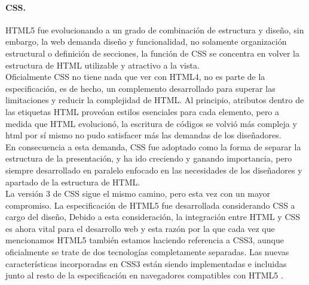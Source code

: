 \documentclass[12pt, a4paper, titlepage]{report}
\begin{document}
			\paragraph{CSS.\\}
			HTML5 fue evolucionando a un grado de combinación de estructura y diseño, sin embargo, la web demanda diseño y funcionalidad, no solamente organización estructural o definición de secciones, la función de CSS se concentra en volver la estructura de HTML utilizable y atractivo a la vista.\\
			
			Oficialmente CSS no tiene nada que ver con HTML4, no es parte de la especificación, es de hecho, un complemento desarrollado para superar las limitaciones y reducir la complejidad de HTML. Al principio, atributos dentro de las etiquetas HTML proveóan estilos esenciales para cada elemento, pero a medida que HTML evolucionó, la escritura de códigos se volvió más compleja y html por sí mismo no pudo satisfacer más las demandas de los diseñadores.\\
			
			En consecuencia a esta demanda, CSS fue adoptado como la forma de separar la estructura de la presentación, y ha ido creciendo y ganando importancia, pero siempre desarrollado en paralelo enfocado en las necesidades de los diseñadores y apartado de la estructura de HTML.\\
			
			La versión 3 de CSS sigue el mismo camino, pero esta vez con un mayor compromiso. La especificación de HTML5 fue desarrollada considerando CSS a cargo del diseño, Debido a esta consideración, la integración entre HTML y CSS es ahora vital para el desarrollo web y esta razón por la que cada vez que mencionamos HTML5 también estamos haciendo referencia a CSS3, aunque oficialmente se trate de dos tecnologías completamente separadas. Las nuevas características incorporadas en CSS3 están siendo implementadas e incluidas junto al resto de la especificación en navegadores compatibles con HTML5 \cite{refElGranLibro}.
			
\end{document}
